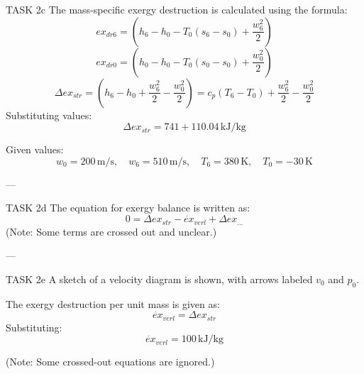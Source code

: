 TASK 2c  
The mass-specific exergy destruction is calculated using the formula:  
\[
ex_{dr6} = (h_6 - h_0 - T_0(s_6 - s_0) + \frac{w_6^2}{2})
\]  
\[
ex_{dr0} = (h_0 - h_0 - T_0(s_0 - s_0) + \frac{w_0^2}{2})
\]  
\[
\Delta ex_{str} = (h_6 - h_0 + \frac{w_6^2}{2} - \frac{w_0^2}{2}) = c_p(T_6 - T_0) + \frac{w_6^2}{2} - \frac{w_0^2}{2}
\]  
Substituting values:  
\[
\Delta ex_{str} = 741 + 110.04 \, \text{kJ/kg}
\]  

Given values:  
\[
w_0 = 200 \, \text{m/s}, \quad w_6 = 510 \, \text{m/s}, \quad T_6 = 380 \, \text{K}, \quad T_0 = -30 \, \text{K}
\]  

---

TASK 2d  
The equation for exergy balance is written as:  
\[
0 = \Delta ex_{str} - \dot{ex}_{verl} + \Delta ex_{...}
\]  
(Note: Some terms are crossed out and unclear.)

---

TASK 2e  
A sketch of a velocity diagram is shown, with arrows labeled \( v_0 \) and \( p_0 \).  

The exergy destruction per unit mass is given as:  
\[
\dot{ex}_{verl} = \Delta ex_{str}
\]  
Substituting:  
\[
\dot{ex}_{verl} = 100 \, \text{kJ/kg}
\]  

(Note: Some crossed-out equations are ignored.)